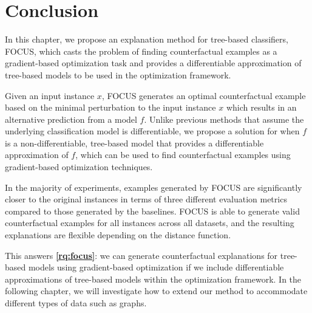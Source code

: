 
\section{Conclusion}
\label{section:focus-conclusion}
In this chapter, we propose an explanation method for tree-based classifiers, FOCUS, which casts the problem of finding counterfactual examples as a gradient-based optimization task and provides a differentiable approximation of tree-based models to be used in the optimization framework. 

Given an input instance $x$, FOCUS generates an optimal counterfactual example based on the minimal perturbation to the input instance $x$ which results in an alternative prediction from a model $f$. 
Unlike previous methods that assume the underlying classification model is differentiable, we propose a solution for when $f$ is a non-differentiable, tree-based model that provides a differentiable approximation of $f$, which can be used to find counterfactual examples using gradient-based optimization techniques.  

In the majority of experiments, examples generated by FOCUS are significantly closer to the original instances in terms of three different evaluation metrics compared to those generated by the baselines. 
FOCUS is able to generate valid counterfactual examples for all instances across all datasets, and the resulting explanations are flexible depending on the distance function. 


This answers \textbf{\ref{rq:focus}}: we can generate counterfactual explanations for tree-based models using gradient-based optimization if we include differentiable approximations of tree-based models within the optimization framework. 
In the following chapter, we will investigate how to extend our method to accommodate different types of data such as graphs. 
